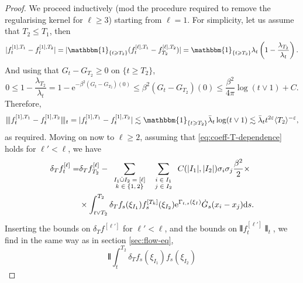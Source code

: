 \documentclass[11pt, a4paper]{scrartcl}
\numberwithin{equation}{section}
\theoremstyle{plain}
\theoremstyle{remark}
\newcommand{\mathd}{\mathrm{d}}
\newcommand{\mathe}{\mathrm{e}}
\newcommand{\tmscript}[1]{\text{\scriptsize{$#1$}}}
\begin{document}
\begin{proof}
	We proceed inductively (mod the procedure required to remove the
	regularising kernel for $\ell \geqslant 3$) starting from $\ell = 1$. For
	simplicity, let us assume that $T_2 \leqslant T_1$, then
	\[ |f^{[1], T_1}_t - f_t^{[1], T_2}|
		=|\mathbbm{1}_{\{ t \geqslant T_2 \}}
		(f_t^{[\ell], T_1} - f_{T_2}^{[\ell], T_2})|
		=\mathbbm{1}_{\{ t \geqslant
			T_2 \}} \lambda_t \left( 1 - \frac{\lambda_{T_2}}{\lambda_t} \right) . \]
	And using that $G_t - G_{T_2} \geqslant 0$ on $\{ t \geqslant T_2 \}$,
	\[ 0 \leqslant 1 - \frac{\lambda_{T_2}}{\lambda_t} = 1 - \mathe^{- \beta^2
			(G_t - G_{T_2}) (0)} \leqslant \beta^2 (G_t - G_{T_2}) (0) \leqslant
		\frac{\beta^2}{4 \pi} \log (t \vee 1) + C. \]
	Therefore,
	\[ \interleave f^{[1], T_1}_t - f_t^{[1], T_2} \interleave_t = | f^{[1],
				T_1}_t - f_t^{[1], T_2} | \lesssim \mathbbm{1}_{\{ t \geqslant T_2 \}}
		\bar{\lambda}_t \log (t \vee 1) \lesssim \bar{\lambda}_t t^{2 \varepsilon} \langle
		T_2 \rangle^{- \varepsilon}, \]
	as required.
	Moving on now to $\ell \geqslant 2$, assuming that
	\eqref{eq:coeff-T-dependence} holds for $\ell' < \ell$, we have
	\begin{equation*}
		\begin{aligned}
			\delta_T f^{[\ell]}_t = & \delta_T f_{T_2}^{[\ell]} -
			\sum_{\tmscript{\begin{array}{c}
						                I_1 \dot{\cup} I_2 = [\ell] \\
						                k \in \{ 1, 2 \}
					                \end{array}}}  \sum_{\tmscript{\begin{array}{c}
						                                               i \in I_1 \\
						                                               j \in I_2
					                                               \end{array}}} C (| I_1 |, | I_2 |)\sigma_i \sigma_j \frac{\beta^2}{2}\times \\
			                        & \times\int_{t \vee T_2}^{T_2}
			\delta_T f_s (\xi_{I_1}) f_s^{[T_k]} (\xi_{I_2}) \mathe^{\Gamma_{t, s}
				(\xi_I)} \dot{G}_s (x_i - x_j) \mathd s.
		\end{aligned}
	\end{equation*}
	\[ \]
	Inserting the bounds on $\delta_T f^{[\ell']}$ for $\ell' < \ell$, and the
	bounds on $\interleave f_t^{[\ell']} \interleave_t$, we find in the same way
	as in section \ref{sec:flow-eq},
	\[ \interleave \int_t^{T_2} \delta_T f_s (\xi_{I_1}) f_s (\xi_{I_2})
\]
\end{proof}
\end{document}
